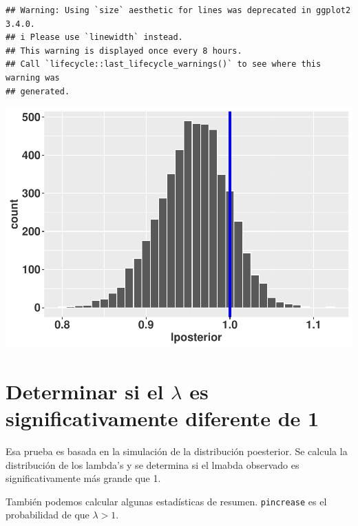 \documentclass[
]{book}
\theoremstyle{definition}
\theoremstyle{definition}
\theoremstyle{definition}
\theoremstyle{definition}
\theoremstyle{remark}
\begin{document}
\begin{verbatim}
## Warning: Using `size` aesthetic for lines was deprecated in ggplot2 3.4.0.
## i Please use `linewidth` instead.
## This warning is displayed once every 8 hours.
## Call `lifecycle::last_lifecycle_warnings()` to see where this warning was
## generated.
\end{verbatim}

\includegraphics{Diagnostico_Poblacional_files/figure-latex/chap7_26-1.pdf}

\section{\texorpdfstring{Determinar si el \(\lambda\) es significativamente diferente de 1}{Determinar si el \textbackslash lambda es significativamente diferente de 1}}\label{determinar-si-el-lambda-es-significativamente-diferente-de-1}

Esa prueba es basada en la simulación de la distribución poesterior. Se calcula la distribución de los lambda's y se determina si el lmabda observado es significativamente más grande que 1.

También podemos calcular algunas estadísticas de resumen. \texttt{pincrease} es el
probabilidad de que \(\lambda > 1\).
\end{document}
